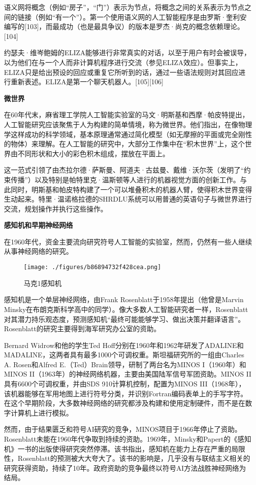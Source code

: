 语义网将概念（例如“房子”，“门”）表示为节点，将概念之间的关系表示为节点之间的链接（例如“有一个”）。第一个使用语义网的人工智能程序是由罗斯·奎利安编写的[103]，而最成功（也是最具争议）的版本是罗杰·尚克的概念依赖理论。[104]

约瑟夫·维岑鲍姆的ELIZA能够进行非常真实的对话，以至于用户有时会被误导，以为他们在与一个人而非计算机程序进行交流（参见ELIZA效应）。但事实上，ELIZA只是给出预设的回应或重复它所听到的话，通过一些语法规则对其回应进行重新表述。ELIZA是第一个聊天机器人。[105][106]

\textbf{微世界}

在60年代末，麻省理工学院人工智能实验室的马文·明斯基和西摩·帕皮特提出，人工智能研究应该聚焦于人为构建的简单情境，称为微世界。他们指出，在像物理学这样成功的科学领域，基本原理通常通过简化模型（如无摩擦的平面或完全刚性的物体）来理解。在人工智能的研究中，大部分工作集中在“积木世界”上，这个世界由不同形状和大小的彩色积木组成，摆放在平面上。

这一范式引领了由杰拉尔德·萨斯曼、阿道夫·古兹曼、戴维·沃尔茨（发明了“约束传播”）以及特别是帕特里克·温斯顿等人进行的机器视觉方面的创新工作。与此同时，明斯基和帕皮特构建了一个可以堆叠积木的机器人臂，使得积木世界变得生动起来。特里·温诺格拉德的SHRDLU系统可以用普通的英语句子与微世界进行交流，规划操作并执行这些操作。

\textbf{感知机和早期神经网络}

在1960年代，资金主要流向研究符号人工智能的实验室，然而，仍然有一些人继续从事神经网络的研究。
\begin{figure}[ht]
\centering
\texttt{[image: ./figures/b86894732f428cea.png]}
\caption{马克1感知机} \label{fig_RGZN_9}
\end{figure}
感知机是一个单层神经网络，由Frank Rosenblatt于1958年提出（他曾是Marvin Minsky在布朗克斯科学高中的同学）。像大多数人工智能研究者一样，Rosenblatt对其潜力持乐观态度，预测感知机“最终可能能够学习、做出决策并翻译语言”。Rosenblatt的研究主要得到海军研究办公室的资助。

Bernard Widrow和他的学生Ted Hoff分别在1960年和1962年研发了ADALINE和MADALINE，这两者具有最多1000个可调权重。斯坦福研究所的一组由Charles A. Rosen和Alfred E.（Ted）Brain领导，研制了两台名为MINOS I（1960年）和MINOS II（1963年）的神经网络机器，主要由美国陆军信号军团资助。MINOS II具有6600个可调权重，并由SDS 910计算机控制，配置为MINOS III（1968年），该机器能够在军用地图上进行符号分类，并识别Fortran编码表单上的手写字符。在这个早期阶段，大多数神经网络的研究都涉及构建和使用定制硬件，而不是在数字计算机上进行模拟。

然而，由于结果匮乏和符号AI研究的竞争，MINOS项目于1966年停止了资助。Rosenblatt未能在1960年代争取到持续的资助。1969年，Minsky和Papert的《感知机》一书的出版使得研究突然停滞。该书指出，感知机在能力上存在严重的局限性，Rosenblatt的预测被大大夸大了。该书的影响是，几乎没有与联结主义相关的研究获得资助，持续了10年。政府资助的竞争最终以符号AI方法战胜神经网络为结局。

